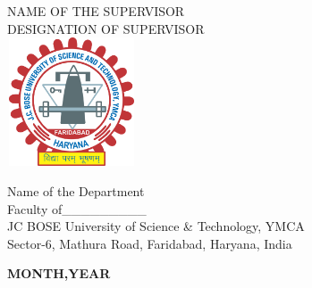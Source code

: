 \chapter*{}
\begin{center}
    \large{NAME OF THE SUPERVISOR}\\
    \large{DESIGNATION OF SUPERVISOR}\\
    \vspace{1.5\baselineskip}
    \includegraphics[height=1.5in,width=1.5in, keepaspectratio]{gfx/logo.png}\\
    \vspace{1.5\baselineskip}

    \normalsize{Name of the Department\\ \vspace{1.5\baselineskip}
     Faculty of\_\_\_\_\_\_\_\_\_\\ \vspace{1.5\baselineskip}
     JC BOSE University of Science \& Technology, YMCA\\ \vspace{1.5\baselineskip}
     Sector-6, Mathura Road, Faridabad, Haryana, India} \vspace{1.5\baselineskip}\\
     \vfil

     \large{\textbf{MONTH,YEAR}}
\end{center}
